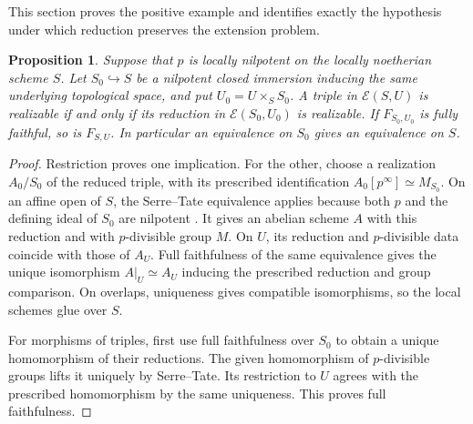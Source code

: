 \documentclass[11pt]{article}
\newtheorem{proposition}[theorem]{Proposition}
\theoremstyle{remark}\newtheorem{remark}[theorem]{Remark}
\newcommand{\Ext}{\mathcal E}
\begin{document}
This section proves the positive example and identifies exactly the hypothesis under which reduction preserves the extension problem.

\begin{proposition}\label{prop:nilpotent}
Suppose that $p$ is locally nilpotent on the locally noetherian scheme $S$. Let $S_0\hookrightarrow S$ be a nilpotent closed immersion inducing the same underlying topological space, and put $U_0=U\times_SS_0$. A triple in $\Ext(S,U)$ is realizable if and only if its reduction in $\Ext(S_0,U_0)$ is realizable. If $F_{S_0,U_0}$ is fully faithful, so is $F_{S,U}$. In particular an equivalence on $S_0$ gives an equivalence on $S$.
\end{proposition}
\begin{proof}
Restriction proves one implication. For the other, choose a realization $A_0/S_0$ of the reduced triple, with its prescribed identification $A_0[p^\infty]\simeq M_{S_0}$. On an affine open of $S$, the Serre--Tate equivalence applies because both $p$ and the defining ideal of $S_0$ are nilpotent \citep[Theorem~1.2.1]{Katz}. It gives an abelian scheme $A$ with this reduction and with $p$-divisible group $M$. On $U$, its reduction and $p$-divisible data coincide with those of $A_U$. Full faithfulness of the same equivalence gives the unique isomorphism $A|_U\simeq A_U$ inducing the prescribed reduction and group comparison. On overlaps, uniqueness gives compatible isomorphisms, so the local schemes glue over $S$.

For morphisms of triples, first use full faithfulness over $S_0$ to obtain a unique homomorphism of their reductions. The given homomorphism of $p$-divisible groups lifts it uniquely by Serre--Tate. Its restriction to $U$ agrees with the prescribed homomorphism by the same uniqueness. This proves full faithfulness.
\end{proof}
\end{document}
